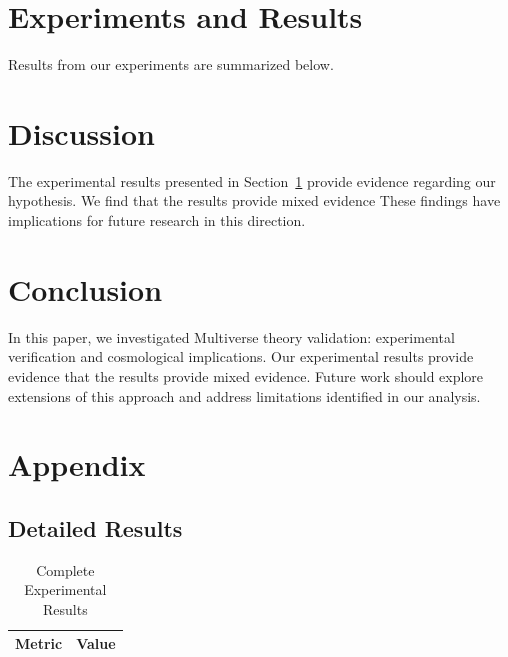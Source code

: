 \documentclass{article}
\begin{document}
\section{Experiments and Results}

\label{sec:results}

Results from our experiments are summarized below.

\section{Discussion}

The experimental results presented in Section~\ref{sec:results} provide evidence regarding our hypothesis. We find that the results provide mixed evidence These findings have implications for future research in this direction.

\section{Conclusion}

In this paper, we investigated Multiverse theory validation: experimental verification and cosmological implications. Our experimental results provide evidence that the results provide mixed evidence. Future work should explore extensions of this approach and address limitations identified in our analysis.

\appendix

\section{Appendix}

\subsection{Detailed Results}

\begin{table}[htbp]
\centering
\caption{Complete Experimental Results}
\begin{tabular}{lc}
\toprule
Metric & Value \\
\midrule
\bottomrule
\end{tabular}
\end{table}




\end{document}
